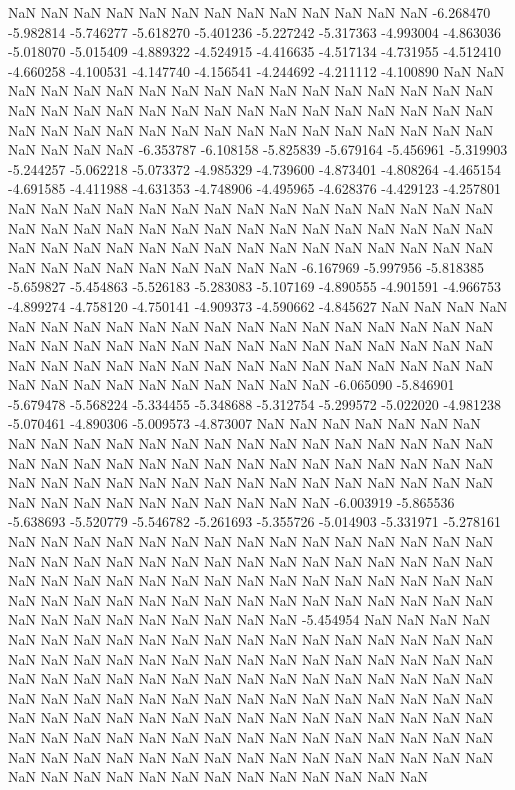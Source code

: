 NaN
NaN
NaN
NaN
NaN
NaN
NaN
NaN
NaN
NaN
NaN
NaN
NaN
-6.268470
-5.982814
-5.746277
-5.618270
-5.401236
-5.227242
-5.317363
-4.993004
-4.863036
-5.018070
-5.015409
-4.889322
-4.524915
-4.416635
-4.517134
-4.731955
-4.512410
-4.660258
-4.100531
-4.147740
-4.156541
-4.244692
-4.211112
-4.100890
NaN
NaN
NaN
NaN
NaN
NaN
NaN
NaN
NaN
NaN
NaN
NaN
NaN
NaN
NaN
NaN
NaN
NaN
NaN
NaN
NaN
NaN
NaN
NaN
NaN
NaN
NaN
NaN
NaN
NaN
NaN
NaN
NaN
NaN
NaN
NaN
NaN
NaN
NaN
NaN
NaN
NaN
NaN
NaN
NaN
NaN
NaN
NaN
NaN
NaN
NaN
-6.353787
-6.108158
-5.825839
-5.679164
-5.456961
-5.319903
-5.244257
-5.062218
-5.073372
-4.985329
-4.739600
-4.873401
-4.808264
-4.465154
-4.691585
-4.411988
-4.631353
-4.748906
-4.495965
-4.628376
-4.429123
-4.257801
NaN
NaN
NaN
NaN
NaN
NaN
NaN
NaN
NaN
NaN
NaN
NaN
NaN
NaN
NaN
NaN
NaN
NaN
NaN
NaN
NaN
NaN
NaN
NaN
NaN
NaN
NaN
NaN
NaN
NaN
NaN
NaN
NaN
NaN
NaN
NaN
NaN
NaN
NaN
NaN
NaN
NaN
NaN
NaN
NaN
NaN
NaN
NaN
NaN
NaN
NaN
NaN
NaN
NaN
-6.167969
-5.997956
-5.818385
-5.659827
-5.454863
-5.526183
-5.283083
-5.107169
-4.890555
-4.901591
-4.966753
-4.899274
-4.758120
-4.750141
-4.909373
-4.590662
-4.845627
NaN
NaN
NaN
NaN
NaN
NaN
NaN
NaN
NaN
NaN
NaN
NaN
NaN
NaN
NaN
NaN
NaN
NaN
NaN
NaN
NaN
NaN
NaN
NaN
NaN
NaN
NaN
NaN
NaN
NaN
NaN
NaN
NaN
NaN
NaN
NaN
NaN
NaN
NaN
NaN
NaN
NaN
NaN
NaN
NaN
NaN
NaN
NaN
NaN
NaN
NaN
NaN
NaN
NaN
NaN
NaN
NaN
NaN
NaN
-6.065090
-5.846901
-5.679478
-5.568224
-5.334455
-5.348688
-5.312754
-5.299572
-5.022020
-4.981238
-5.070461
-4.890306
-5.009573
-4.873007
NaN
NaN
NaN
NaN
NaN
NaN
NaN
NaN
NaN
NaN
NaN
NaN
NaN
NaN
NaN
NaN
NaN
NaN
NaN
NaN
NaN
NaN
NaN
NaN
NaN
NaN
NaN
NaN
NaN
NaN
NaN
NaN
NaN
NaN
NaN
NaN
NaN
NaN
NaN
NaN
NaN
NaN
NaN
NaN
NaN
NaN
NaN
NaN
NaN
NaN
NaN
NaN
NaN
NaN
NaN
NaN
NaN
NaN
NaN
NaN
NaN
NaN
-6.003919
-5.865536
-5.638693
-5.520779
-5.546782
-5.261693
-5.355726
-5.014903
-5.331971
-5.278161
NaN
NaN
NaN
NaN
NaN
NaN
NaN
NaN
NaN
NaN
NaN
NaN
NaN
NaN
NaN
NaN
NaN
NaN
NaN
NaN
NaN
NaN
NaN
NaN
NaN
NaN
NaN
NaN
NaN
NaN
NaN
NaN
NaN
NaN
NaN
NaN
NaN
NaN
NaN
NaN
NaN
NaN
NaN
NaN
NaN
NaN
NaN
NaN
NaN
NaN
NaN
NaN
NaN
NaN
NaN
NaN
NaN
NaN
NaN
NaN
NaN
NaN
NaN
NaN
NaN
NaN
NaN
NaN
NaN
-5.454954
NaN
NaN
NaN
NaN
NaN
NaN
NaN
NaN
NaN
NaN
NaN
NaN
NaN
NaN
NaN
NaN
NaN
NaN
NaN
NaN
NaN
NaN
NaN
NaN
NaN
NaN
NaN
NaN
NaN
NaN
NaN
NaN
NaN
NaN
NaN
NaN
NaN
NaN
NaN
NaN
NaN
NaN
NaN
NaN
NaN
NaN
NaN
NaN
NaN
NaN
NaN
NaN
NaN
NaN
NaN
NaN
NaN
NaN
NaN
NaN
NaN
NaN
NaN
NaN
NaN
NaN
NaN
NaN
NaN
NaN
NaN
NaN
NaN
NaN
NaN
NaN
NaN
NaN
NaN
NaN
NaN
NaN
NaN
NaN
NaN
NaN
NaN
NaN
NaN
NaN
NaN
NaN
NaN
NaN
NaN
NaN
NaN
NaN
NaN
NaN
NaN
NaN
NaN
NaN
NaN
NaN
NaN
NaN
NaN
NaN
NaN
NaN
NaN
NaN
NaN
NaN
NaN
NaN
NaN
NaN
NaN
NaN
